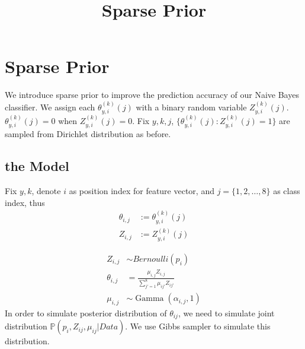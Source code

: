 \documentclass[12pt]{article}
\title{Sparse Prior}
\DeclareMathOperator{\Gam}{Gamma}
\begin{document}
\maketitle

\section{Sparse Prior}
We introduce sparse prior to improve the prediction accuracy of our Naive Bayes classifier. We assign each $\theta_{y,i}^{(k)}(j)$ with a binary random variable $Z_{y,i}^{(k)}(j)$. $\theta_{y,i}^{(k)}(j)=0$ when $Z_{y,i}^{(k)}(j)=0$. Fix $y,k,j$, $\{\theta_{y,i}^{(k)}(j):Z_{y,i}^{(k)}(j)=1\}$ are sampled from Dirichlet distribution as before.

\subsection{the Model}
Fix $y,k$, denote $i$ as position index for feature vector, and $j = \{1,2, \ldots,8\} $ as class index, thus
\begin{align*}
\theta_{i,j} &:= \theta_{y,i}^{(k)}(j) \\
Z_{i,j} &:= Z_{y,i}^{(k)}(j)
\end{align*}

\begin{align*}
Z_{i,j} &\sim Bernoulli (p_i) \\
\theta_{i,j} &= \frac{\mu_{i,j} Z_{i,j}}{\sum_{j'=1}^8 \mu_{ij'} Z_{ij'}} \\
\mu_{i,j} &\sim \Gam(\alpha_{i,j},1)
\end{align*}
In order to simulate posterior distribution of $\theta_{ij}$, we need to simulate joint distribution $\mathbb{P} (p_i, Z_{ij}, \mu_{ij} | Data)$. We use Gibbs sampler to simulate this distribution.
\end{document}
